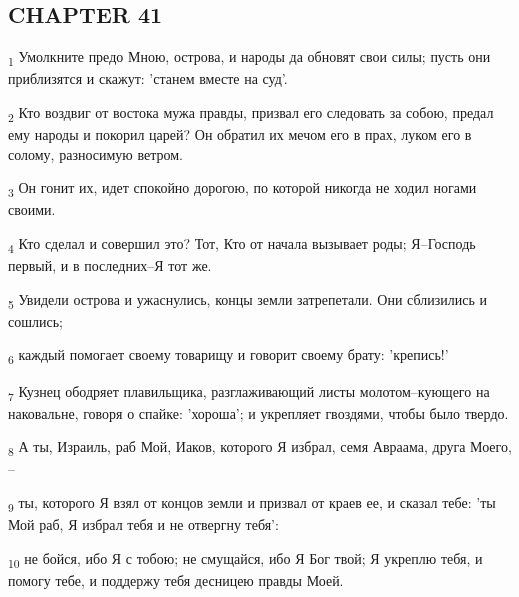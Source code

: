 \subsection{CHAPTER 41}
\begin{tcolorbox}
\textsubscript{1} Умолкните предо Мною, острова, и народы да обновят свои силы; пусть они приблизятся и скажут: 'станем вместе на суд'.
\end{tcolorbox}
\begin{tcolorbox}
\textsubscript{2} Кто воздвиг от востока мужа правды, призвал его следовать за собою, предал ему народы и покорил царей? Он обратил их мечом его в прах, луком его в солому, разносимую ветром.
\end{tcolorbox}
\begin{tcolorbox}
\textsubscript{3} Он гонит их, идет спокойно дорогою, по которой никогда не ходил ногами своими.
\end{tcolorbox}
\begin{tcolorbox}
\textsubscript{4} Кто сделал и совершил это? Тот, Кто от начала вызывает роды; Я--Господь первый, и в последних--Я тот же.
\end{tcolorbox}
\begin{tcolorbox}
\textsubscript{5} Увидели острова и ужаснулись, концы земли затрепетали. Они сблизились и сошлись;
\end{tcolorbox}
\begin{tcolorbox}
\textsubscript{6} каждый помогает своему товарищу и говорит своему брату: 'крепись!'
\end{tcolorbox}
\begin{tcolorbox}
\textsubscript{7} Кузнец ободряет плавильщика, разглаживающий листы молотом--кующего на наковальне, говоря о спайке: 'хороша'; и укрепляет гвоздями, чтобы было твердо.
\end{tcolorbox}
\begin{tcolorbox}
\textsubscript{8} А ты, Израиль, раб Мой, Иаков, которого Я избрал, семя Авраама, друга Моего, --
\end{tcolorbox}
\begin{tcolorbox}
\textsubscript{9} ты, которого Я взял от концов земли и призвал от краев ее, и сказал тебе: 'ты Мой раб, Я избрал тебя и не отвергну тебя':
\end{tcolorbox}
\begin{tcolorbox}
\textsubscript{10} не бойся, ибо Я с тобою; не смущайся, ибо Я Бог твой; Я укреплю тебя, и помогу тебе, и поддержу тебя десницею правды Моей.
\end{tcolorbox}
